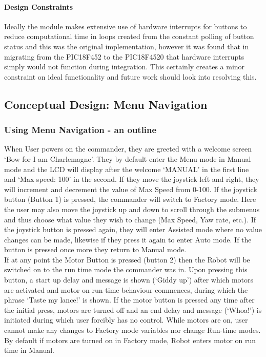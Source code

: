 \documentclass[MTRX3700report.tex]{subfiles}
\begin{document}
	\paragraph{Design Constraints}
	Ideally the module makes extensive use of hardware interrupts for buttons to reduce computational time in loops created from the constant polling of button status and this was the original implementation, however it was found that in migrating from the PIC18F452 to the PIC18F4520 that hardware interrupts simply would not function during integration. This certainly creates a minor constraint on ideal functionality and future work should look into resolving this.
	
	\subsection{Conceptual Design: Menu Navigation}

	
	\subsubsection{Using Menu Navigation - an outline}
	When User powers on the commander, they are greeted with a welcome screen `Bow for I am Charlemagne'. They by default enter the Menu mode in Manual mode and the LCD will display after the welcome `MANUAL' in the first line and `Max speed: 100' in the second. If they move the joystick left and right, they will increment and decrement the value of Max Speed from 0-100. If the joystick button (Button 1) is pressed, the commander will switch to Factory mode. Here the user may also move the joystick up and down to scroll through the submenus and thus choose what value they wish to change (Max Speed, Yaw rate, etc.). If the joystick button is pressed again, they will enter Assisted mode where no value changes can be made, likewise if they press it again to enter Auto mode. If the button is pressed once more they return to Manual mode.\\
	
	If at any point the Motor Button is pressed (button 2) then the Robot will be switched on to the run time mode the commander was in. Upon pressing this button, a start up delay and message is shown (`Giddy up') after which motors are activated and motor on run-time behaviour commences, during which the phrase `Taste my lance!' is shown. If the motor button is pressed any time after the initial press, motors are turned off and an end delay and message (`Whoa!') is initiated during which user forcibly has no control. While motors are on, user cannot make any changes to Factory mode variables nor change Run-time modes. By default if motors are turned on in Factory mode, Robot enters motor on run time in Manual.
	
\end{document}
